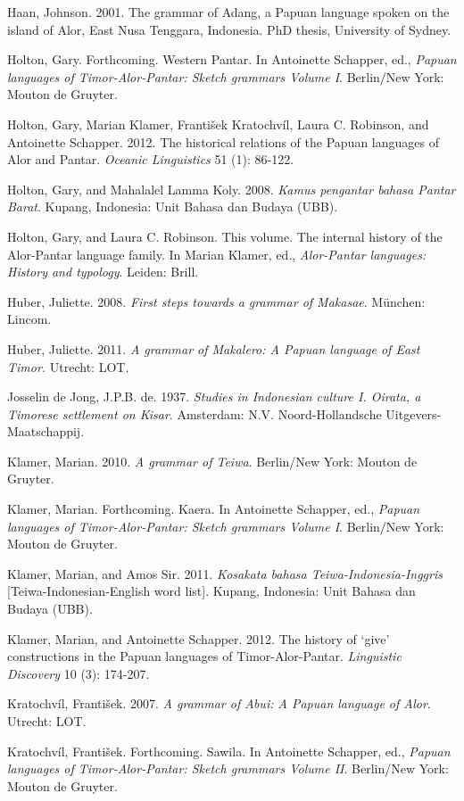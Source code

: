 \documentclass[a4paper]{article}
\begin{document}
Haan, Johnson. 2001. The grammar of Adang, a Papuan language spoken on the island of Alor, East Nusa Tenggara, Indonesia. PhD thesis, University of Sydney.

Holton, Gary. Forthcoming. Western Pantar. In Antoinette Schapper, ed., \textit{Papuan languages of Timor-Alor-Pantar: Sketch grammars Volume I}. Berlin/New York: Mouton de Gruyter.

Holton, Gary, Marian Klamer, Franti\v{s}ek Kratochv\'il, Laura C. Robinson, and Antoinette Schapper. 2012. The historical relations of the Papuan languages of Alor and Pantar. \textit{Oceanic Linguistics} 51 (1): 86-122.

Holton, Gary, and Mahalalel Lamma Koly. 2008. \textit{Kamus pengantar bahasa Pantar Barat}. Kupang, Indonesia: Unit Bahasa dan Budaya (UBB).

Holton, Gary, and Laura C. Robinson. This volume. The internal history of the Alor-Pantar language family. In Marian Klamer, ed., \textit{Alor-Pantar languages: History and typology}. Leiden: Brill.

Huber, Juliette. 2008. \textit{First steps towards a grammar of Makasae}. M\"unchen: Lincom.

Huber, Juliette. 2011. \textit{A grammar of Makalero: A Papuan language of East Timor}\textit{.} Utrecht: LOT.

Josselin de Jong, J.P.B. de. 1937. \textit{Studies in Indonesian culture I. Oirata, a Timorese settlement on Kisar}. Amsterdam: N.V. Noord-Hollandsche Uitgevers-Maatschappij.

Klamer, Marian. 2010. \textit{A grammar of Teiwa}. Berlin/New York: Mouton de Gruyter.

Klamer, Marian. Forthcoming. Kaera. In Antoinette Schapper, ed., \textit{Papuan languages of Timor-Alor-Pantar: Sketch grammars Volume I}. Berlin/New York: Mouton de Gruyter. 

Klamer, Marian, and Amos Sir. 2011. \textit{Kosakata bahasa Teiwa-Indonesia-Inggris} [Teiwa-Indonesian-English word list]. Kupang, Indonesia: Unit Bahasa dan Budaya (UBB).

Klamer, Marian, and Antoinette Schapper. 2012. The history of {\textquoteleft}give{\textquoteright} constructions in the Papuan languages of Timor-Alor-Pantar. \textit{Linguistic Discovery} 10 (3): 174-207. 

Kratochv\'il, Franti\v{s}ek. 2007. \textit{A grammar of Abui: A Papuan language of Alor}. Utrecht: LOT.

Kratochv\'il, Franti\v{s}ek. Forthcoming. Sawila. In Antoinette Schapper, ed., \textit{Papuan languages of Timor-Alor-Pantar: Sketch grammars Volume II}. Berlin/New York: Mouton de Gruyter.
\end{document}
